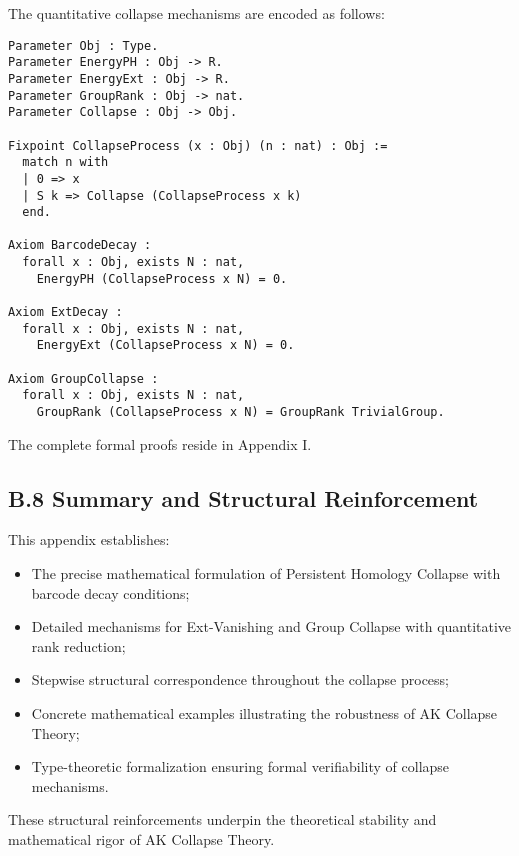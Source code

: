 \documentclass[11pt]{article}
\begin{document}
The quantitative collapse mechanisms are encoded as follows:

\begin{lstlisting}[language=Coq, caption=Quantitative Collapse Encoding]
Parameter Obj : Type.
Parameter EnergyPH : Obj -> R.
Parameter EnergyExt : Obj -> R.
Parameter GroupRank : Obj -> nat.
Parameter Collapse : Obj -> Obj.

Fixpoint CollapseProcess (x : Obj) (n : nat) : Obj :=
  match n with
  | 0 => x
  | S k => Collapse (CollapseProcess x k)
  end.

Axiom BarcodeDecay :
  forall x : Obj, exists N : nat,
    EnergyPH (CollapseProcess x N) = 0.

Axiom ExtDecay :
  forall x : Obj, exists N : nat,
    EnergyExt (CollapseProcess x N) = 0.

Axiom GroupCollapse :
  forall x : Obj, exists N : nat,
    GroupRank (CollapseProcess x N) = GroupRank TrivialGroup.
\end{lstlisting}

The complete formal proofs reside in Appendix I.

\subsection*{B.8 Summary and Structural Reinforcement}

This appendix establishes:

\begin{itemize}
    \item The precise mathematical formulation of Persistent Homology Collapse with barcode decay conditions;
    \item Detailed mechanisms for Ext-Vanishing and Group Collapse with quantitative rank reduction;
    \item Stepwise structural correspondence throughout the collapse process;
    \item Concrete mathematical examples illustrating the robustness of AK Collapse Theory;
    \item Type-theoretic formalization ensuring formal verifiability of collapse mechanisms.
\end{itemize}

These structural reinforcements underpin the theoretical stability and mathematical rigor of AK Collapse Theory.

\FloatBarrier



\end{document}
